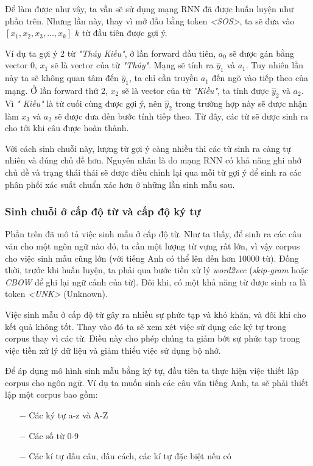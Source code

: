 Để làm được như vậy, ta vẫn sẽ sử dụng mạng RNN đã được huấn luyện như phần trên. Nhưng lần này, thay vì mở đầu bằng token \textit{<SOS>}, ta sẽ đưa vào $[x_1, x_2, x_3,...,x_k]$ $k$ từ đầu tiên được gợi ý.

Ví dụ ta gợi ý 2 từ \textit{"Thúy Kiều"}, ở lần forward đầu tiên, $a_0$ sẽ được gán bằng vector $0$, $x_1$ sẽ là vector của từ \textit{"Thúy"}. Mạng sẽ tính ra $\hat{y}_1$ và $a_1$. Tuy nhiên lần này ta sẽ không quan tâm đến $\hat{y}_1$, ta chỉ cần truyền $a_1$ đến ngõ vào tiếp theo của mạng. Ở lần forward thứ 2, $x_2$ sẽ là vector của từ \textit{"Kiều"}, ta tính được $\hat{y}_2$ và $a_2$. Vì \textit{"
Kiều"} là từ cuối cùng được gợi ý, nên $\hat{y}_2$ trong trường hợp này sẽ được nhận làm $x_3$ và $a_2$ sẽ được đưa đến bước tính tiếp theo. Từ đây, các từ sẽ được sinh ra cho tới khi câu được hoàn thành.

Với cách sinh chuỗi này, lượng từ gợi ý càng nhiều thì các từ sinh ra càng tự nhiên và đúng chủ đề hơn. Nguyên nhân là do mạng RNN có khả năng ghi nhớ chủ đề và trạng thái thái sẽ được điều chỉnh lại qua mỗi từ gợi ý để sinh ra các phân phối xác suất chuẩn xác hơn ở những lần sinh mẫu sau.

\subsubsection{Sinh chuỗi ở cấp độ từ và cấp độ ký tự}
Phần trên đã mô tả việc sinh mẫu ở cấp độ từ. Như ta thấy, để sinh ra các câu văn cho một ngôn ngữ nào đó, ta cần một lượng từ vựng rất lớn, vì vậy corpus cho việc sinh mẫu cũng lớn (với tiếng Anh có thể lên đến hơn 10000 từ). Đồng thời, trước khi huấn luyện, ta phải qua bước tiền xử lý \textit{word2vec} (\textit{skip-gram} hoặc \textit{CBOW} để ghi lại ngữ cảnh của từ). Đôi khi, có một khả năng từ được sinh ra là token \textit{<UNK>} (Unknown).

Việc sinh mẫu ở cấp độ từ gây ra nhiều sự phức tạp và khó khăn, và đôi khi cho kết quả không tốt. Thay vào đó ta sẽ xem xét việc sử dụng các ký tự trong corpus thay vì các từ. Điều này cho phép chúng ta giảm bớt sự phức tạp trong việc tiền xử lý dữ liệu và giảm thiểu việc sử dụng bộ nhớ.

Để áp dụng mô hình sinh mẫu bằng ký tự, đầu tiên ta thực hiện việc thiết lập corpus cho ngôn ngữ. Ví dụ ta muốn sinh các câu văn tiếng Anh, ta sẽ phải thiết lập một corpus bao gồm:
\begin{itemize}
    \item[$-$] Các ký tự a-z và A-Z
    \item[$-$] Các số từ 0-9
    \item[$-$] Các kí tự dấu câu, dấu cách, các kí tự đặc biệt nếu có
\end{itemize}

